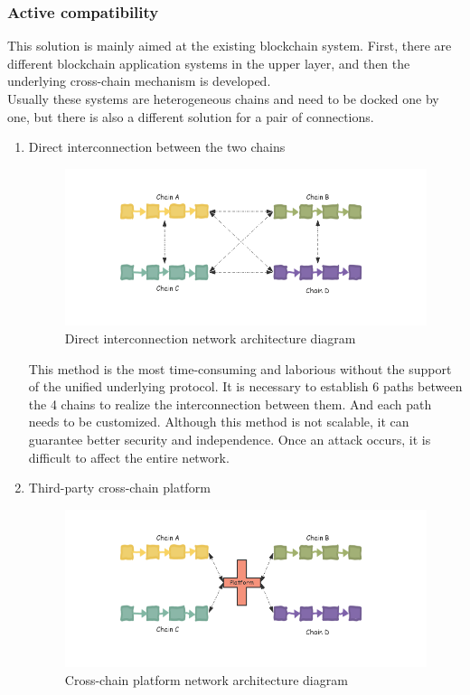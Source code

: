\subsubsection{Active compatibility}
\noindent This solution is mainly aimed at the existing blockchain system. First, there are different blockchain application systems in the upper layer, and then the underlying cross-chain mechanism is developed.\\
\noindent Usually these systems are heterogeneous chains and need to be docked one by one, but there is also a different solution for a pair of connections.
\begin{enumerate}
    \item Direct interconnection between the two chains
        \begin{figure}[H]
        \includegraphics[width=1\textwidth]{./figures/direct.png}
        \centering
        \caption{Direct interconnection network architecture diagram}
        \centering
        \label{fig:direct}
        
        \end{figure}
    This method is the most time-consuming and laborious without the support of the unified underlying protocol. It is necessary to establish 6 paths between the 4 chains to realize the interconnection between them. And each path needs to be customized. Although this method is not scalable, it can guarantee better security and independence. Once an attack occurs, it is difficult to affect the entire network.
    \item Third-party cross-chain platform
      \begin{figure}[H]
        \includegraphics[width=1\textwidth]{./figures/platform.png}
        \centering
        \caption{Cross-chain platform network architecture diagram}
        \centering
        \label{fig:platform}
        

\end{figure}
\end{enumerate}

